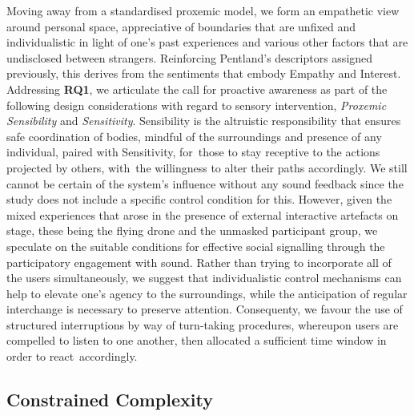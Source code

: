 Moving away from a standardised proxemic model, we form an empathetic view around personal space, appreciative of boundaries that are unfixed and individualistic in light of one's past experiences and various other factors that are undisclosed between strangers. Reinforcing Pentland's descriptors assigned previously, this derives from the sentiments that embody Empathy and Interest. Addressing \textbf{RQ1}, we articulate the call for proactive awareness as part of the following design considerations with regard to sensory intervention, \textit{Proxemic Sensibility} and \textit{Sensitivity}. Sensibility is the altruistic responsibility that ensures safe coordination of bodies, mindful of the surroundings and presence of any individual, paired with Sensitivity, for~those to stay receptive to the actions projected by others, with~the willingness to alter their paths accordingly. We still cannot be certain of the system's influence without any sound feedback since the study does not include a specific control condition for this. However, given the mixed experiences that arose in the presence of external interactive artefacts on stage, these being the flying drone and the unmasked participant group, we speculate on the suitable conditions for effective social signalling through the participatory engagement with sound. Rather than trying to incorporate all of the users simultaneously, we suggest that individualistic control mechanisms can help to elevate one's agency to the surroundings, while the anticipation of regular interchange is necessary to preserve attention. Consequenty, we favour the use of structured interruptions by way of turn-taking procedures, whereupon users are compelled to listen to one another, then allocated a sufficient time window in order to react~accordingly.

\subsection*{Constrained Complexity}
\label{subsec:discussion_complexity}

